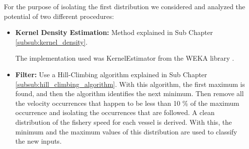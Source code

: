 For the purpose of isolating the first distribution we considered and analyzed the potential of two different procedures:
\begin{itemize}

\item \textbf{Kernel Density Estimation:} Method explained in Sub Chapter \ref{subsub:kernel_density}.

The implementation used was KernelEstimator from the WEKA library  \cite{WEBSITE:Weka}.

 

\item \textbf{Filter:}
Use a Hill-Climbing algorithm explained in Sub Chapter \ref{subsub:hill_climbing_algorithm}.
With this algorithm, the first maximum is found, and then the algorithm identifies the next minimum.
Then remove all the velocity occurrences that happen to be less than 10 \% of the maximum occurrence and isolating the occurrences that are followed. A clean distribution of the fishery speed for each vessel is derived. With this, the minimum and the maximum values of this distribution are used to classify the new inputs.
\end{itemize}

